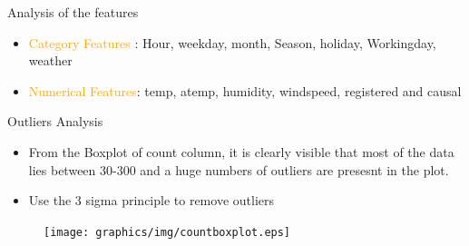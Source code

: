 \documentclass[
 size=14pt,
 paper=smartboard,  %
 mode=present, 		%
 display=slides, 	%
 style=tuliplab,  	%
 pauseslide,
 fleqn,leqno]{powerdot}
\begin{document}
\begin{slide}[toc=,bm=]{Analysis of the features}

  \begin{itemize}
  \item \textcolor{orange}{Category Features} : Hour, weekday, month, Season, holiday, Workingday, weather 
  \item \textcolor{orange}{Numerical Features}:  temp, atemp, humidity, windspeed, registered and causal 
 
  \end{itemize}
  \end{slide}

\begin{slide}[toc=,bm=]{ Outliers Analysis}

  \begin{itemize}
  \item From the Boxplot of count column, it is clearly visible that most of the data lies between 30-300 and a huge numbers of outliers are presesnt in the plot.
  \item Use the 3 sigma principle to remove outliers
  \end{itemize}
  \begin{figure}
    \centering
    \centerline{\texttt{[image: graphics/img/countboxplot.eps]}}
  \end{figure}
  \end{slide}
  
\end{document}
